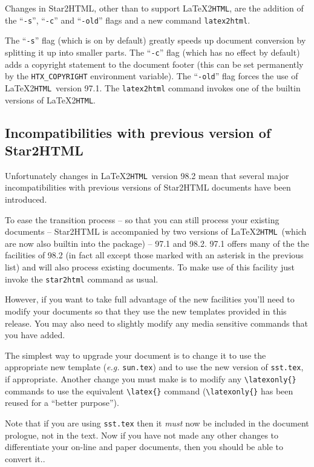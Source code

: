 \documentclass[twoside,11pt]{article}
\newcommand{\htmlref}[2]{#1}
\newcommand{\latex}[1]{#1}
\newcommand{\latextohtml}{\LaTeX2\texttt{HTML}}
\renewcommand{\_}{\texttt{\symbol{95}}}
\begin{document}
Changes in Star2HTML, other than to support \latextohtml, are the
addition of the ``\verb#-s#'', ``\verb#-c#'' and ``\verb#-old#'' flags 
and a new command \verb#latex2html#.

The ``\verb#-s#'' flag (which is on by default) greatly speeds up
document conversion by splitting it up into smaller parts.
The ``\verb#-c#'' flag (which has no effect by default) adds a
copyright statement to the document footer (this can be set
permanently by the \verb#HTX_COPYRIGHT# environment variable).
The ``\verb#-old#'' flag forces the use of \latextohtml\ version
97.1. The \verb#latex2html# command invokes one of the builtin
versions of \latextohtml.

\subsection{Incompatibilities with previous version of Star2HTML}

Unfortunately changes in \latextohtml\ version 98.2 mean that several
major incompatibilities with previous versions of Star2HTML documents
have been introduced. 

To ease the transition process -- so that you can still process your
existing documents -- Star2HTML is accompanied by two versions of
\latextohtml\ (which are now also builtin into the package) -- 97.1
and 98.2. 97.1 offers many of the the facilities of 98.2 (in fact all
except those marked with an asterisk in the previous
\htmlref{list}{changes13}) and will also process
existing documents. To make use of this facility just invoke the
\verb#star2html# command as usual.

However, if you want to take full advantage of the new facilities
you'll need to modify your documents so that they use the new
templates provided in this release. You may also need to slightly
modify any media sensitive commands that you have added.

The simplest way to upgrade your document is to change it to use the
appropriate new template (\textit{e.g.} \verb#sun.tex#) and to use the
new version of \verb#sst.tex#, if appropriate. Another change you must
make is to modify any \verb#\latexonly{}# commands to use the
equivalent \verb#\latex{}# command (\verb#\latexonly{}# has been
reused for a ``better purpose'').

Note that if you are using \verb#sst.tex# then it \emph{must} now be
included in the document prologue, not in the text. Now if you have
not made any other changes to differentiate your on-line and paper
documents, then you should be able to convert it..
\end{document}
